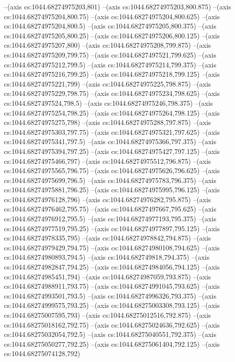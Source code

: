 --(axis cs:1044.68274975203,801)
--(axis cs:1044.68274975203,800.875)
--(axis cs:1044.68274975204,800.75)
--(axis cs:1044.68274975204,800.625)
--(axis cs:1044.68274975204,800.5)
--(axis cs:1044.68274975205,800.375)
--(axis cs:1044.68274975205,800.25)
--(axis cs:1044.68274975206,800.125)
--(axis cs:1044.68274975207,800)
--(axis cs:1044.68274975208,799.875)
--(axis cs:1044.68274975209,799.75)
--(axis cs:1044.6827497521,799.625)
--(axis cs:1044.68274975212,799.5)
--(axis cs:1044.68274975214,799.375)
--(axis cs:1044.68274975216,799.25)
--(axis cs:1044.68274975218,799.125)
--(axis cs:1044.68274975221,799)
--(axis cs:1044.68274975225,798.875)
--(axis cs:1044.68274975229,798.75)
--(axis cs:1044.68274975234,798.625)
--(axis cs:1044.6827497524,798.5)
--(axis cs:1044.68274975246,798.375)
--(axis cs:1044.68274975254,798.25)
--(axis cs:1044.68274975264,798.125)
--(axis cs:1044.68274975275,798)
--(axis cs:1044.68274975288,797.875)
--(axis cs:1044.68274975303,797.75)
--(axis cs:1044.68274975321,797.625)
--(axis cs:1044.68274975341,797.5)
--(axis cs:1044.68274975366,797.375)
--(axis cs:1044.68274975394,797.25)
--(axis cs:1044.68274975427,797.125)
--(axis cs:1044.68274975466,797)
--(axis cs:1044.68274975512,796.875)
--(axis cs:1044.68274975565,796.75)
--(axis cs:1044.68274975626,796.625)
--(axis cs:1044.68274975699,796.5)
--(axis cs:1044.68274975783,796.375)
--(axis cs:1044.68274975881,796.25)
--(axis cs:1044.68274975995,796.125)
--(axis cs:1044.68274976128,796)
--(axis cs:1044.68274976282,795.875)
--(axis cs:1044.68274976462,795.75)
--(axis cs:1044.6827497667,795.625)
--(axis cs:1044.68274976912,795.5)
--(axis cs:1044.68274977193,795.375)
--(axis cs:1044.68274977519,795.25)
--(axis cs:1044.68274977897,795.125)
--(axis cs:1044.68274978335,795)
--(axis cs:1044.68274978842,794.875)
--(axis cs:1044.68274979429,794.75)
--(axis cs:1044.68274980108,794.625)
--(axis cs:1044.68274980893,794.5)
--(axis cs:1044.682749818,794.375)
--(axis cs:1044.68274982847,794.25)
--(axis cs:1044.68274984056,794.125)
--(axis cs:1044.68274985451,794)
--(axis cs:1044.68274987059,793.875)
--(axis cs:1044.68274988911,793.75)
--(axis cs:1044.68274991045,793.625)
--(axis cs:1044.68274993501,793.5)
--(axis cs:1044.68274996326,793.375)
--(axis cs:1044.68274999575,793.25)
--(axis cs:1044.68275003308,793.125)
--(axis cs:1044.68275007595,793)
--(axis cs:1044.68275012516,792.875)
--(axis cs:1044.68275018162,792.75)
--(axis cs:1044.68275024636,792.625)
--(axis cs:1044.68275032054,792.5)
--(axis cs:1044.68275040551,792.375)
--(axis cs:1044.68275050277,792.25)
--(axis cs:1044.68275061404,792.125)
--(axis cs:1044.68275074128,792)
